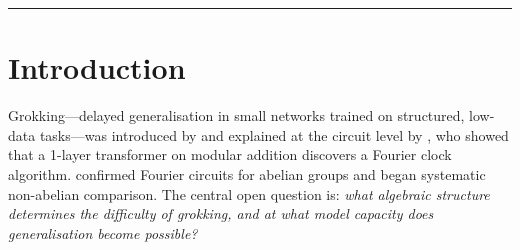 \documentclass[11pt]{article}
\begin{document}
\vspace{4pt}\hrule\vspace{14pt}

\section{Introduction}
\label{sec:intro}

Grokking---delayed generalisation in small networks trained on structured,
low-data tasks---was introduced by \citet{power2022grokking} and explained
at the circuit level by \citet{nanda2023progress}, who showed that a 1-layer
transformer on modular addition discovers a Fourier clock algorithm.
\citet{chughtai2023toy} confirmed Fourier circuits for abelian groups and
began systematic non-abelian comparison.
The central open question is: \emph{what algebraic structure determines
the difficulty of grokking, and at what model capacity does generalisation
become possible?}
\end{document}
